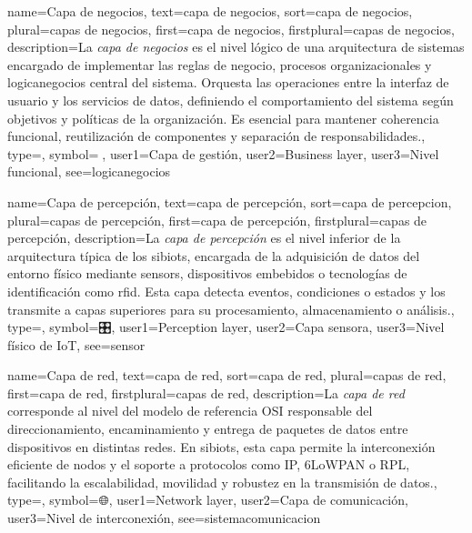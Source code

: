 	
	{
		name={Capa de negocios},
		text={capa de negocios},
		sort={capa de negocios},
		plural={capas de negocios},
		first={capa de negocios},
		firstplural={capas de negocios},
		description={La \emph{capa de negocios} es el nivel l{\'o}gico de una arquitectura de sistemas encargado de implementar las reglas de negocio, procesos organizacionales y \gls{logicanegocios} central del sistema. Orquesta las operaciones entre la \gls{interfaz} de usuario y los servicios de datos, definiendo el comportamiento del sistema seg{\'u}n objetivos y pol{\'i}ticas de la organizaci{\'o}n. Es esencial para mantener coherencia funcional, reutilizaci{\'o}n de componentes y separaci{\'o}n de responsabilidades.},
		type=\glsdefaulttype,
		symbol={🏢},
		user1={Capa de gesti{\'o}n},
		user2={Business layer},
		user3={Nivel funcional},
		see={logicanegocios}
	}
	
	{
		name={Capa de percepci{\'o}n},
		text={capa de percepci{\'o}n},
		sort={capa de percepcion},
		plural={capas de percepci{\'o}n},
		first={capa de percepci{\'o}n},
		firstplural={capas de percepci{\'o}n},
		description={La \emph{capa de percepci{\'o}n} es el nivel inferior de la arquitectura t{\'i}pica de los \glspl{sibiot}, encargada de la adquisici{\'o}n de datos del entorno f{\'i}sico mediante \glspl{sensor}, dispositivos embebidos o tecnolog{\'i}as de identificaci{\'o}n como \gls{rfid}. Esta capa detecta eventos, condiciones o estados y los transmite a capas superiores para su procesamiento, almacenamiento o an{\'a}lisis.},
		type=\glsdefaulttype,
		symbol={🎛️},
		user1={Perception layer},
		user2={Capa sensora},
		user3={Nivel f{\'i}sico de IoT},
		see={sensor}
	}
	
	{
		name={Capa de red},
		text={capa de red},
		sort={capa de red},
		plural={capas de red},
		first={capa de red},
		firstplural={capas de red},
		description={La \emph{capa de red} corresponde al nivel del modelo de referencia OSI responsable del direccionamiento, encaminamiento y entrega de paquetes de datos entre \glspl{dispositivo} en distintas redes. En \glspl{sibiot}, esta capa permite la interconexi{\'o}n eficiente de nodos y el soporte a protocolos como IP, 6LoWPAN o RPL, facilitando la \gls{escalabilidad}, \gls{movilidad} y robustez en la transmisi{\'o}n de datos.},
		type=\glsdefaulttype,
		symbol={🌐},
		user1={Network layer},
		user2={Capa de comunicaci{\'o}n},
		user3={Nivel de interconexi{\'o}n},
		see={sistemacomunicacion}
	}
	
